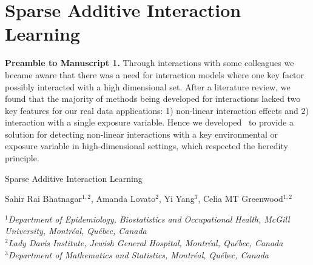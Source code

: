 \chapter{Sparse Additive Interaction Learning\label{ch:sail}}

\indent \textbf{Preamble to Manuscript 1.} Through interactions with some colleagues we became aware that there was a need for interaction models where one key factor possibly interacted with a high dimensional set. After a literature review, we found that the majority of methods being developed for interactions lacked two key features for our real data applications: 1) non-linear interaction effects and 2) interaction with a single exposure variable. Hence we developed \sail ~to provide a solution for detecting non-linear interactions with a key environmental or exposure variable in high-dimensional settings, which respected the heredity principle.\newpage

\vspace*{2cm}

\begin{center}
	\Large{Sparse Additive Interaction Learning}
\end{center}

\vspace*{4cm}

\begin{center}
	Sahir Rai Bhatnagar$^{1,2}$, Amanda Lovato$^{2}$, Yi Yang$^{3}$, Celia MT Greenwood$^{1,2}$
\end{center}

\vspace*{1cm}
\begin{center}
$^{1}$\textit{Department of Epidemiology, Biostatistics and Occupational Health, McGill University, Montr\'{e}al, Qu\'{e}bec, Canada}\\
$^{2}$\textit{Lady Davis Institute, Jewish General Hospital, Montr\'{e}al, Qu\'{e}bec, Canada} \\
$^{3}$\textit{Department of Mathematics and Statistics, Montr\'{e}al, Qu\'{e}bec, Canada}\\
\end{center}



